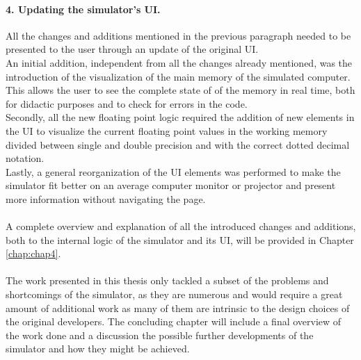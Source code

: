 \paragraph{4. Updating the simulator's UI.}
All the changes and additions mentioned in the previous paragraph needed to be presented to the user through an update of the original UI.\\
An initial addition, independent from all the changes already mentioned, was the introduction of the visualization of the main memory of the simulated computer. This allows the user to see the complete state of of the memory in real time, both for didactic purposes and to check for errors in the code.\\
Secondly, all the new floating point logic required the addition of new elements in the UI to visualize the current floating point values in the working memory divided between single and double precision and with the correct dotted decimal notation.\\
Lastly, a general reorganization of the UI elements was performed to make the simulator fit better on an average computer monitor or projector and present more information without navigating the page.

\paragraph{}
A complete overview and explanation of all the introduced changes and additions, both to the internal logic of the simulator and its UI, will be provided in Chapter \ref{chap:chap4}.

\paragraph{}
The work presented in this thesis only tackled a subset of the problems and shortcomings of the simulator, as they are numerous and would require a great amount of additional work as many of them are intrinsic to the design choices of the original developers. The concluding chapter will include a final overview of the work done and a discussion the possible further developments of the simulator and how they might be achieved.